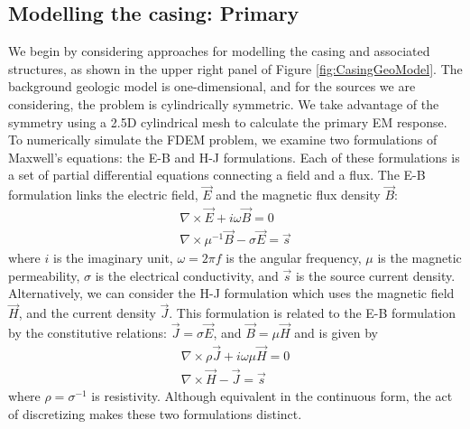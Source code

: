 \documentclass{segabs}
\newcommand{\curl}{{\nabla \times}}
\begin{document}
\subsection{Modelling the casing: Primary}
We begin by considering approaches for modelling the casing and associated structures, as shown in the upper right panel of Figure \ref{fig:CasingGeoModel}. The background geologic model is one-dimensional, and for the sources we are considering, the problem is cylindrically symmetric. We take advantage of the symmetry using a 2.5D cylindrical mesh to calculate the primary EM response. To numerically simulate the FDEM problem, we examine two formulations of Maxwell's equations: the E-B and H-J formulations. Each of these formulations is a set of partial differential equations connecting a field and a flux. The E-B formulation links the electric field, $\vec{E}$ and the magnetic flux density $\vec{B}$:
\begin{equation}
	\begin{split}
		\curl \vec{E} + i \omega \vec{B} = 0 \\
		\curl \mu^{-1} \vec{B} - \sigma \vec{E} = \vec{s}
	\end{split}
	\label{eq:maxwellEB}
\end{equation}
where $i$ is the imaginary unit, $\omega = 2\pi f$ is the angular frequency, $\mu$ is the magnetic permeability, $\sigma$ is the electrical conductivity, and $\vec{s}$ is the source current density. Alternatively, we can consider the H-J formulation which uses the magnetic field $\vec{H}$, and the current density $\vec{J}$. This formulation is related to the E-B formulation by the constitutive relations: $\vec{J} = \sigma \vec{E}$, and $\vec{B} = \mu \vec{H}$ and is given by
\begin{equation}
	\begin{split}
		\curl \rho \vec{J} + i \omega \mu \vec{H} = 0 \\
		\curl \vec{H} - \vec{J} = \vec{s}
	\end{split}
	\label{eq:maxwellHJ}
\end{equation}
where $\rho = \sigma^{-1}$ is resistivity. Although equivalent in the continuous form, the act of discretizing makes these two formulations distinct.
\end{document}
